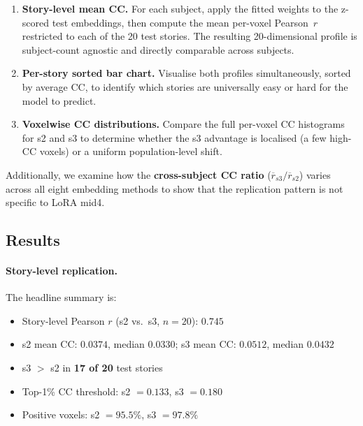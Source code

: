 \documentclass[letterpaper,12pt]{article}
\begin{document}
\begin{enumerate}[label=(\arabic*)]
  \item \textbf{Story-level mean CC.}  For each subject, apply the fitted
        weights to the z-scored test embeddings, then compute the mean
        per-voxel Pearson~$r$ restricted to each of the 20 test stories.
        The resulting 20-dimensional profile is subject-count agnostic
        and directly comparable across subjects.
  \item \textbf{Per-story sorted bar chart.}  Visualise both profiles
        simultaneously, sorted by average CC, to identify which stories
        are universally easy or hard for the model to predict.
  \item \textbf{Voxelwise CC distributions.}  Compare the full
        per-voxel CC histograms for s2 and s3 to determine whether the
        s3 advantage is localised (a few high-CC voxels) or a uniform
        population-level shift.
\end{enumerate}

Additionally, we examine how the \textbf{cross-subject CC ratio}
($\overline{r}_{s3}/\overline{r}_{s2}$) varies across all eight embedding
methods to show that the replication pattern is not specific to LoRA mid4.

\subsection{Results}

\paragraph{Story-level replication.}
The headline summary is:

\begin{itemize}
  \item Story-level Pearson $r$ (s2 vs.\ s3, $n = 20$): $\mathbf{0.745}$
  \item s2 mean CC: $0.0374$, median $0.0330$;\quad
        s3 mean CC: $0.0512$, median $0.0432$
  \item s3 $>$ s2 in \textbf{17 of 20} test stories
  \item Top-1\% CC threshold: s2 $= 0.133$, s3 $= 0.180$
  \item Positive voxels: s2 $= 95.5\%$, s3 $= 97.8\%$
\end{itemize}
\end{document}
